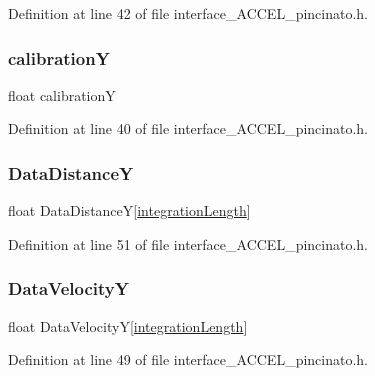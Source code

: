 Definition at line 42 of file interface\+\_\+\+A\+C\+C\+E\+L\+\_\+pincinato.\+h.

\mbox{\label{struct_process_data___a0630656d6ec984a6917aba7d0617d87b}} 
\subsubsection{\texorpdfstring{calibrationY}{calibrationY}}
{\footnotesize\ttfamily float calibrationY}



Definition at line 40 of file interface\+\_\+\+A\+C\+C\+E\+L\+\_\+pincinato.\+h.

\mbox{\label{struct_process_data___ac4266b27959dc8e308a8741c9913f93c}} 
\subsubsection{\texorpdfstring{Data\+DistanceY}{DataDistanceY}}
{\footnotesize\ttfamily float Data\+DistanceY\mbox{[}\mbox{\hyperlink{interface___a_c_c_e_l__pincinato_8h_aeee7ebe36cd3653f48821e6d0da7029d}{integration\+Length}}\mbox{]}}



Definition at line 51 of file interface\+\_\+\+A\+C\+C\+E\+L\+\_\+pincinato.\+h.

\mbox{\label{struct_process_data___a4fa27dc016870a216daf63ba65059a0b}} 
\subsubsection{\texorpdfstring{Data\+VelocityY}{DataVelocityY}}
{\footnotesize\ttfamily float Data\+VelocityY\mbox{[}\mbox{\hyperlink{interface___a_c_c_e_l__pincinato_8h_aeee7ebe36cd3653f48821e6d0da7029d}{integration\+Length}}\mbox{]}}



Definition at line 49 of file interface\+\_\+\+A\+C\+C\+E\+L\+\_\+pincinato.\+h.

